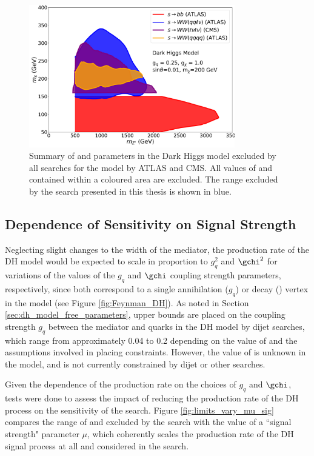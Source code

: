\begin{figure}[h]
  \centering
  \includegraphics[width=0.8\textwidth]{Figures/8/combined_contour.pdf}
  \caption[]{Summary of \ms and \mZp parameters in the Dark Higgs model excluded by all searches for the model by ATLAS and CMS. All values of \ms and \mZp contained within a coloured area are excluded. The range excluded by the search presented in this thesis is shown in blue.}
  \label{fig:limits_comparison}
\end{figure}


\subsection{Dependence of Sensitivity on Signal Strength}

Neglecting slight changes to the width of the \Zprime mediator, the production rate of the DH model would be expected to scale in proportion to \(g_q^2\) and \(\gchi^2\) \cite{griffiths_2008} for variations of the values of the \(g_q\) and \(\gchi\) coupling strength parameters, respectively, since both correspond to a single annihilation (\(g_q\)) or decay (\gchi) vertex in the model (see Figure \ref{fig:Feynman_DH}). As noted in Section \ref{sec:dh_model_free_parameters}, upper bounds are placed on the coupling strength \(g_q\) between the \Zprime mediator and quarks in the DH model by dijet searches, which range from approximately 0.04 to 0.2 depending on the value of \mZp and the assumptions involved in placing constraints. However, the value of \gchi is unknown in the model, and is not currently constrained by dijet or other searches. 

Given the dependence of the production rate on the choices of \(g_q\) and \(\gchi\), tests were done to assess the impact of reducing the production rate of the DH process on the sensitivity of the search. Figure \ref{fig:limits_vary_mu_sig} compares the range of \ms and \mZp excluded by the search with the value of a ``signal strength" parameter \(\mu\), which coherently scales the production rate of the DH signal process at all \ms and \mZp considered in the search.  


